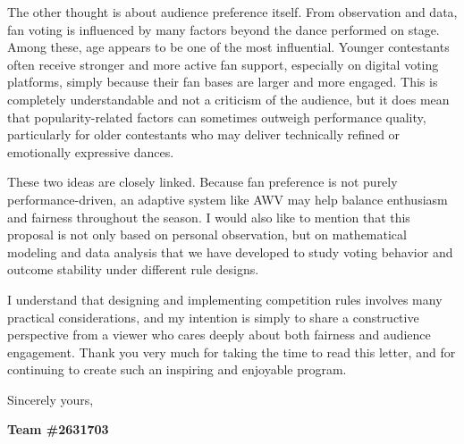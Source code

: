 \documentclass{mcmthesis}
\begin{document}
The other thought is about audience preference itself. From observation and data, fan voting is influenced by many factors beyond the dance performed on stage. Among these, age appears to be one of the most influential. Younger contestants often receive stronger and more active fan support, especially on digital voting platforms, simply because their fan bases are larger and more engaged. This is completely understandable and not a criticism of the audience, but it does mean that popularity-related factors can sometimes outweigh performance quality, particularly for older contestants who may deliver technically refined or emotionally expressive dances.

These two ideas are closely linked. Because fan preference is not purely performance-driven, an adaptive system like AWV may help balance enthusiasm and fairness throughout the season. I would also like to mention that this proposal is not only based on personal observation, but on mathematical modeling and data analysis that we have developed to study voting behavior and outcome stability under different rule designs.

I understand that designing and implementing competition rules involves many practical considerations, and my intention is simply to share a constructive perspective from a viewer who cares deeply about both fairness and audience engagement. Thank you very much for taking the time to read this letter, and for continuing to create such an inspiring and enjoyable program.

\vspace{1.5cm}                    %

\hfill Sincerely yours,           %

\hfill {\bf Team \#2631703}     
\end{document}

